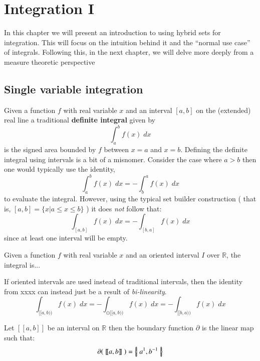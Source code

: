 \chapter{Integration I}

In this chapter we will present an introduction to using hybrid sets for integration.
This will focus on the intuition behind it and the ``normal use case'' of integrals.
Following this, in the next chapter, we will delve more deeply from a measure theoretic perspective

\section{Single variable integration}

Given a function $f$ with real variable $x$ and an interval $[a,b]$ on the (extended) real line a traditional \textbf{definite integral} given by
\begin{equation*}
	\int_a^b f(x) \; dx
\end{equation*}
is the signed area bounded by $f$ between $x=a$ and $x=b$.
Defining the definite integral using intervals is a bit of a misnomer.
Consider the case where $a > b$ then one would typically use the identity,
\begin{equation}
	\int_a^b f(x) \; dx = - \int_b^a f(x) \; dx
\end{equation}
to evaluate the integral.
However, using the typical set builder construction ( that is, $[a,b] = \{ x | a \leq x \leq b \}$ ) it does \emph{not} follow that:
\begin{equation}
	\int_{[a,b]} f(x) \; dx = - \int_{[b,a]} f(x) \; dx
\end{equation}
since at least one interval will be empty.


\begin{definition}
Given a function $f$ with real variable $x$ and an oriented interval $I$ over $\mathbb{R}$, the integral is...
\end{definition}

If oriented intervals are used instead of traditional intervals, then the identity from xxxx  can instead just be a result of \emph{bi-linearity}.
\begin{equation}
	\int_{[\![a,b)\!)} f(x) \; dx = - \int_{\ominus [\![a,b)\!)} f(x) \; dx = - \int_{[\![b,a)\!)} f(x) \; dx
\end{equation}


\begin{definition}
	Let $[\![ a,b ]\!]$ be an interval on $\mathbb{R}$ then the boundary function $\partial$ is the linear map such that:
	\begin{equation}
		\partial( \;[\![a,b]\!]\; ) = \left\{ \! \left| \;  a^1, b^{-1}  \; \right| \! \right\}
	\end{equation}
\end{definition}

